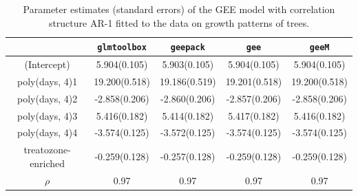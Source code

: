 \begin{table}[!ht]
{\small
\begin{center}
\begin{tabular}{ccccc} 
 \hline                                                                       
                    & {\tt glmtoolbox}& {\tt geepack} & {\tt gee}     & {\tt geeM} \\\hline                                                               
(Intercept)         &  \hfill  5.904(0.105) &  \hfill 5.903(0.105) & \hfill  5.904(0.105) & \hfill  5.904(0.105)\\                                              poly(days, 4)1      &  \hfill 19.200(0.518) & \hfill 19.186(0.519) & \hfill 19.201(0.518) & \hfill 19.200(0.518)\\
poly(days, 4)2      &  \hfill -2.858(0.206) & \hfill -2.860(0.206) & \hfill -2.857(0.206) & \hfill -2.858(0.206)\\
poly(days, 4)3      &  \hfill  5.416(0.182) & \hfill 5.414(0.182)  & \hfill  5.417(0.182) & \hfill  5.416(0.182)\\
poly(days, 4)4      &  \hfill -3.574(0.125) & \hfill -3.572(0.125) & \hfill -3.574(0.125) & \hfill -3.574(0.125)\\
treatozone-enriched &  \hfill -0.259(0.128) & \hfill -0.257(0.128) & \hfill -0.259(0.128) & \hfill -0.259(0.128)\\
$\rho$              &               0.97    &       0.97           &        0.97          & 0.97\\\hline
\end{tabular}
\end{center}
\caption{Parameter estimates (standard errors) of the GEE model with correlation structure AR-1 fitted to the data on growth
patterns of trees.}
\label{GeesS}}
\end{table}
                                                                                                                                                                 
